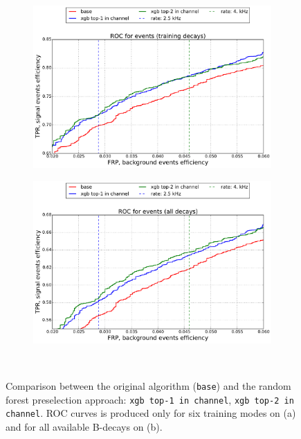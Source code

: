 \documentclass{llncs}
\begin{document}
\begin{figure}
	\begin{center}
    	\begin{subfigure}[b]{0.45\textwidth}
    		\includegraphics[width=\textwidth]{../../img/roc_training_top_xgb} \caption{}
    	\end{subfigure} %
    	\begin{subfigure}[b]{0.45\textwidth}
    		\includegraphics[width=\textwidth]{../../img/roc_all_top_xgb} \caption{} %
    	\end{subfigure}
    \end{center}
  \caption{Comparison between the original algorithm (\texttt{base}) and the random forest preselection approach: \texttt{xgb top-1 in channel}, \texttt{xgb top-2 in channel}. ROC curves is produced only for six training modes on (a) and for all available B-decays on (b).}~\label{fig:xgb_channel}
\end{figure}
\end{document}
